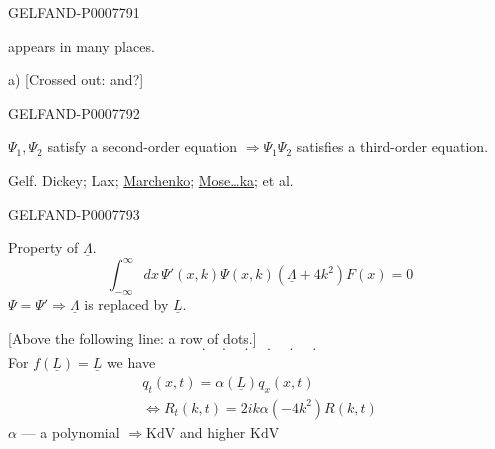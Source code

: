 \begin{GelfandAdjacentEvidence}{GELFAND-P000779}{1}

appears in many places.

a) [Crossed out: and?]
\end{GelfandAdjacentEvidence}
\begin{GelfandAdjacentEvidence}{GELFAND-P000779}{2}

\(\Psi_1,\Psi_2\) satisfy a second-order equation \(\Rightarrow\Psi_1\Psi_2\) satisfies a third-order equation.

Gelf. Dickey; Lax; \underline{Marchenko}; \underline{Mose…ka}; et al.
\end{GelfandAdjacentEvidence}
\begin{GelfandAdjacentEvidence}{GELFAND-P000779}{3}


Property of \(\underline\Lambda\).
\begin{equation}
\int_{-\infty}^\infty dx\,\Psi'(x,k)\Psi(x,k)(\underline\Lambda+4k^2)F(x)=0\tag{13}
\end{equation}
\(\Psi=\Psi'\Rightarrow\underline\Lambda\) is replaced by \(\underline L\).

[Above the following line: a row of dots.]
\[
\cdot\quad\cdot\quad\cdot\quad\cdot\quad\cdot\quad\cdot
\]
For \(f(\underline L)=\underline L\) we have
\begin{equation}
\begin{gathered}
q_t(x,t)=\alpha(\underline L)q_x(x,t)\\
\Longleftrightarrow
R_t(k,t)=2ik\alpha(-4k^2)R(k,t)
\end{gathered}\tag{14}
\end{equation}
\(\alpha\) --- a polynomial \(\Rightarrow\mathrm{KdV}\) and higher \(\mathrm{KdV}\)
\end{GelfandAdjacentEvidence}
